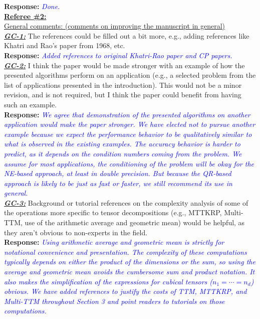 \documentclass{article}
\newcommand{\response}[1]{\textbf{Response:} \textcolor{blue}{\textit{#1}}\\}
\begin{document}
\response{Done.}


\noindent \underline{\textbf{Referee \#2:}} \\

\noindent\underline{General comments: (comments on improving the manuscript in general)}\\

\noindent \ul{\textit{\textbf{GC-1:}}} The references could be filled out a bit more, e.g., adding references like Khatri and Rao's paper from 1968, etc.\\

\response{Added references to original Khatri-Rao paper and CP papers.}

\noindent \ul{\textit{\textbf{GC-2:}}} I think the paper would be made stronger with an example of how the presented algorithms perform on an application (e.g., a selected problem from the list of applications presented in the introduction). This would not be a minor revision, and is not required, but I think the paper could benefit from having such an example.\\

\response{We agree that demonstration of the presented algorithms on another application would make the paper stronger.  We have elected not to pursue another example because we expect the performance behavior to be qualitatively similar to what is observed in the existing examples.  The accuracy behavior is harder to predict, as it depends on the condition numbers coming from the problem.  We assume for most applications, the conditioning of the problem will be okay for the NE-based approach, at least in double precision.  But because the QR-based approach is likely to be just as fast or faster, we still recommend its use in general.}

\noindent \ul{\textit{\textbf{GC-3:}}} Background or tutorial references on the complexity analysis of some of the operations more specific to tensor decompositions (e.g., MTTKRP, Multi-TTM, use of the arithmetic average and geometric mean) would be helpful, as they aren't obvious to non-experts in the field.\\

\response{Using arithmetic average and geometric mean is strictly for notational convenience and presentation.  The complexity of these computations typically depends on either the product of the dimensions or the sum, so using the average and geometric mean avoids the cumbersome sum and product notation.  It also makes the simplification of the expressions for cubical tensors ($n_1=\cdots=n_d$) obvious.  We have added references to justify the costs of TTM, MTTKRP, and Multi-TTM throughout Section 3 and point readers to tutorials on those computations.}
\end{document}
